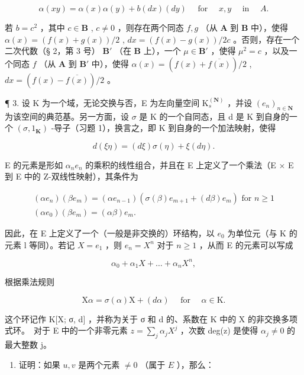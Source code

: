 \[
\alpha (x y) = \alpha (x) \alpha (y) + b (d x) (d y) \quad \text { for } \quad x, y \quad \text { in } \quad A.
\]

若 \(b = c^2\) ，其中 \(c \in \mathbf{B}\) , \(c \neq 0\) ，则存在两个同态 \(f, g\) （从 \(\mathbf{A}\) 到 \(\mathbf{B}\) 中），使得 \(\alpha(x) = (f(x) + g(x)) / 2\) , \(dx = (f(x) - g(x)) / 2c\) 。否则，存在一个二次代数（§ 2，第 3 号） \(\mathbf{B}'\) （在 \(\mathbf{B}\) 上），一个 \(\mu \in \mathbf{B}'\) ，使得 \(\mu^2 = c\) ，以及一个同态 \(f\) （从 \(\mathbf{A}\) 到 \(\mathbf{B}'\) 中），使得 \(\alpha(x) = (f(x) + \overline{f(x)}) / 2\) , \(dx = (f(x) - \overline{f(x)}) / 2\) 。

¶ 3. 设 K 为一个域，无论交换与否，E 为左向量空间 \(\mathrm{K}_{s}^{(\mathbf{N})}\) ，并设 \((e_{n})_{n\in\mathbf{N}}\) 为该空间的典范基。另一方面，设 \(\sigma\) 是 K 的一个自同态，且 d 是 K 到自身的一个 \((\sigma,1_{\mathbf{K}})\) -导子（习题 1），换言之，即 K 到自身的一个加法映射，使得

\[
d (\xi \eta) = (d \xi) \sigma (\eta) + \xi (d \eta).
\]

E 的元素是形如 \(\alpha_{n}e_{n}\) 的乘积的线性组合，并且在 E 上定义了一个乘法（E × E 到 E 中的 Z-双线性映射），其条件为

\[
\begin{array}{l} (\alpha e _ {n}) (\beta e _ {m}) = (\alpha e _ {n - 1}) (\sigma (\beta) e _ {m + 1} + (d \beta) e _ {m}) \text { for } n \geqslant 1 \\ (\alpha e _ {0}) (\beta e _ {m}) = (\alpha \beta) e _ {m}. \end{array}
\]

因此，在 E 上定义了一个（一般是非交换的）环结构，以 \(e_{0}\) 为单位元（与 K 的元素 l 等同）。若记 \(X = e_{1}\) ，则 \(e_{n} = X^{n}\) 对于 \(n \geqslant 1\) ，从而 E 的元素可以写成

\[
\alpha_ {0} + \alpha_ {1} X + \dots + \alpha_ {n} X ^ {n},
\]

根据乘法规则

\[
\mathrm{X} \alpha = \sigma (\alpha) \mathrm{X} + (d \alpha) \quad \text { for } \quad \alpha \in \mathrm{K}.
\]

这个环记作 K{[}X; σ, d{]} ，并称为关于 σ 和 d 的、系数在 K 中的 X 的非交换多项式环。~对于 E 中的一个非零元素 \(z = \sum_{j} \alpha_{j} X^{j}\) ，次数 deg(z) 是使得 \(\alpha_{j} \neq 0\) 的最大整数 j。

\begin{enumerate}
\def\labelenumi{(\alph{enumi})}
\tightlist
\item
  证明：如果 \(u, v\) 是两个元素 \(\neq 0\) （属于 \(E\) ），那么：
\end{enumerate}

